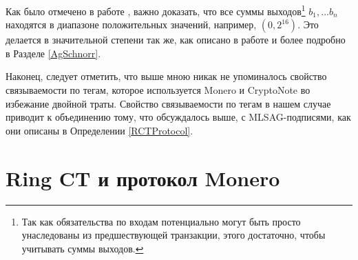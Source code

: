 \documentclass{mrl}
\theoremstyle{definition}
\numberwithin{thm}{section}
\begin{document}
Как было отмечено в работе \cite{GM}, важно доказать, что все суммы выходов\footnote{Так как обязательства по входам потенциально могут быть просто унаследованы из предшествующей транзакции, этого достаточно, чтобы учитывать суммы выходов.} $b_{1},...b_{n}$ находятся в диапазоне положительных значений, например, $(0,2^{16}).$
Это делается в значительной степени так же, как описано в работе \cite{GM} и более подробно в Разделе \ref{AgSchnorr}.
\begin{comment}
\begin{itemize}
\item Write each output amount $b_i$ as
\[
 b_i = \delta_{ij}
\]

\item Prove first $C_{out-i}^{\left(j\right)}\in\left\{ 0,2^{j}\right\} $
for all $j\in\left\{ 0,1,...,16\right\} .$ This is done as in \cite{GM}:
for example, $C_{out-i}^{0}=y_{i}^{0}G+b_{i}^{0}H$ where $b_{i}^{0}\in\left\{ 0,1\right\} $.
Let
\[
C_{out-i}^{\prime0}=C_{out-i}^{0}-H=y_{i}G+b_{i}^{0}H-H
\]
 so that if $b_{i}^{0}=0$, then $C_{out}^{\prime0}=y_{i}G$ and if
$b_{i}^{0}=1$, then $C_{out}^{0}=y_{i}G$, and in either case, the
ring signature on $\left\{ C_{out}^{0},C_{out}^{\prime0}\right\} $
can be signed for.
\item By carefully choosing the blinding values (i.e. ensuring that $\sum_{j}y_{i}^{j}=y_{i}$ for each $j$), define
\[
C_{out-i}=\sum_{j=1}^{16}C_{out-i}^{\left(j\right)}
\]
\item By homomorphicity of the commitments, $b_{i}=\sum_{j}\delta_{ji}2^{j}$,
where $\delta_{ji}$ is the $j^{th}$ digit in the binary expansion
of $b_{i}$.
\end{itemize}
Thus in total, by the above, the sum of inputs into a transaction
equals the outputs, yet the specific input (and it's index!) is hidden.
In addition, the outputs are positive values.
\end{comment}

Наконец, следует отметить, что выше мною никак не упоминалось свойство связываемости по тегам, которое используется Monero и CryptoNote во избежание двойной траты. Свойство связываемости по тегам в нашем случае приводит к объединению тому, что обсуждалось выше, с MLSAG-подписями, как они описаны в Определении \ref{RCTProtocol}.

\section{\label{sec:Ring-CT-ForMonero}Ring CT и протокол Monero}
\end{document}
